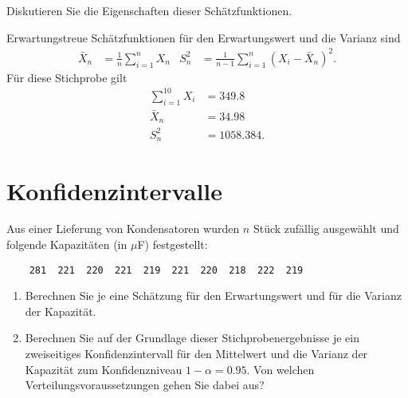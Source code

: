 Diskutieren Sie die Eigenschaften dieser Schätzfunktionen.

\solution Erwartungstreue Schätzfunktionen für den Erwartungswert und
die Varianz sind
\begin{align*}
    \bar X_n &= \frac{1}{n} \sum_{i=1}^{n} X_n & S_n^{2} &= \frac{1}{n-1} \sum_{i=1}^{n} \left( X_i - \bar X_n \right)^{2}. 
\end{align*}
Für diese Stichprobe gilt
\begin{align*}
    \sum_{i=1}^{10} X_i &= 349.8 \\
    \bar X_n &= 34.98 \\
    S^2_n &= 1058.384.
\end{align*}




\section{Konfidenzintervalle}

 Aus einer Lieferung von
Kondensatoren wurden $n$ Stück zufällig ausgewählt und folgende Kapazitäten (in
$\mu$F) festgestellt:
\begin{lstlisting}
    281  221  220  221  219  221  220  218  222  219
\end{lstlisting}
\begin{enumerate}
    \item Berechnen Sie je eine Schätzung für den Erwartungswert und für die
        Varianz der Kapazität. 
    \item Berechnen Sie auf der Grundlage dieser Stichprobenergebnisse je ein
        zweiseitiges Konfidenzintervall für den Mittelwert und die Varianz der
        Kapazität zum Konfidenzniveau $1-\alpha = 0.95$. Von welchen
        Verteilungsvoraussetzungen gehen Sie dabei aus?
\end{enumerate}

